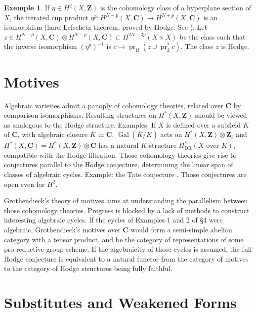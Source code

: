 \documentclass[11pt,a4paper]{article}
\theoremstyle{plain}
\theoremstyle{definition}
\newtheorem{example}[theorem]{Exemple}
\DeclareMathOperator{\Gal}{Gal}
\DeclareMathOperator{\pr}{pr}
\begin{document}
\begin{example}
If $\eta \in H^{2}(X,\mathbf{Z})$ is the cohomology class of a hyperplane section of $X$, the iterated cup product $\eta^{p} : H^{N-p}(X,\mathbf{C}) \to H^{N+p}(X,\mathbf{C})$ is an isomorphism (hard Lefschetz theorem, proved by Hodge. See \cite[IV.6]{weil1958}). Let $z \in H^{N-p}(X,\mathbf{C}) \otimes H^{N-p}(X,\mathbf{C}) \subset H^{2N-2p}(X \times X)$ be the class such that the inverse isomorphism $(\eta^{p})^{-1}$ is $c \mapsto \pr_{1!}(z \cup \pr_{2}^{*} c)$. The class $z$ is Hodge.
\end{example}

\section{Motives}

Algebraic varieties admit a panoply of cohomology theories, related over $\mathbf{C}$ by comparison isomorphisms. Resulting structures on $H^{*}(X,\mathbf{Z})$ should be viewed as analogous to the Hodge structure. Examples: If $X$ is defined over a subfield $K$ of $\mathbf{C}$, with algebraic closure $\bar{K}$ in $\mathbf{C}$, $\Gal(\bar{K}/K)$ acts on $H^{*}(X,\mathbf{Z}) \otimes \mathbf{Z}_{\ell}$ and $H^{*}(X,\mathbf{C}) = H^{*}(X,\mathbf{Z}) \otimes \mathbf{C}$ has a natural $K$-structure $H_{\text{DR}}^{*}(X \text{ over } K)$, compatible with the Hodge filtration. Those cohomology theories give rise to conjectures parallel to the Hodge conjecture, determining the linear span of classes of algebraic cycles. Example: the Tate conjecture \cite{tate1965}. Those conjectures are open even for $H^{2}$.

Grothendieck's theory of motives aims at understanding the parallelism between those cohomology theories. Progress is blocked by a lack of methods to construct interesting algebraic cycles. If the cycles of Examples 1 and 2 of \S 4 were algebraic, Grothendieck's motives over $\mathbf{C}$ would form a semi-simple abelian category with a tensor product, and be the category of representations of some pro-reductive group-scheme. If the algebraicity of those cycles is assumed, the full Hodge conjecture is equivalent to a natural functor from the category of motives to the category of Hodge structures being fully faithful.

\section{Substitutes and Weakened Forms}
\end{document}
